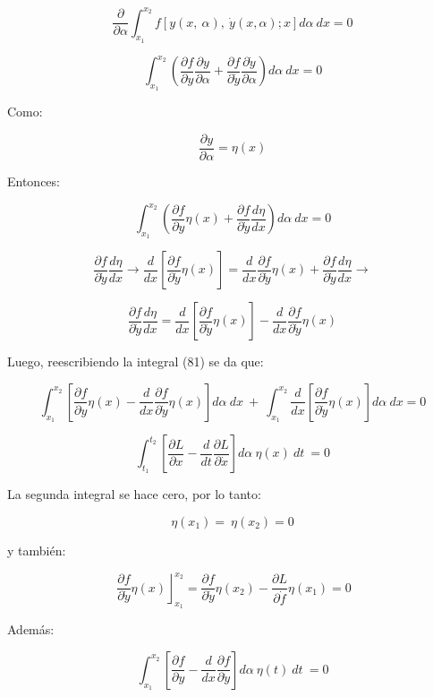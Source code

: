 \documentclass[]{article}
\begin{document}
\[\frac{\partial}{\partial\alpha}\int_{x_{1}}^{x_{2}}{f\left\lbrack y(x,\ \alpha),\ \dot{y}(x,\alpha);x \right\rbrack d\alpha\ dx = 0}\]

\[\int_{x_{1}}^{x_{2}}{\left( \frac{\partial f}{\partial y}\frac{\partial y}{\partial\alpha} + \frac{\partial f}{\partial\dot{y}}\frac{\partial\dot{y}}{\partial\alpha} \right)d\alpha\ dx = 0}\]

Como:

\[\frac{\partial y}{\partial\alpha} = \eta(x)\]

Entonces:

\[\int_{x_{1}}^{x_{2}}{\left( \frac{\partial f}{\partial y}\eta(x) + \frac{\partial f}{\partial\dot{y}}\frac{d\eta}{dx} \right)d\alpha\ dx = 0}\]

\[\frac{\partial f}{\partial\dot{y}}\frac{d\eta}{dx} \rightarrow \frac{d}{dx}\left\lbrack \frac{\partial f}{\partial\dot{y}}\eta(x) \right\rbrack = \frac{d}{dx}\frac{\partial f}{\partial\dot{y}}\eta(x) + \frac{\partial f}{\partial\dot{y}}\frac{d\eta}{dx} \rightarrow\]

\[\frac{\partial f}{\partial\dot{y}}\frac{d\eta}{dx} = \frac{d}{dx}\left\lbrack \frac{\partial f}{\partial\dot{y}}\eta(x) \right\rbrack - \frac{d}{dx}\frac{\partial f}{\partial\dot{y}}\eta(x)\]

Luego, reescribiendo la integral (81) se da que:

\[\int_{x_{1}}^{x_{2}}{\left\lbrack \frac{\partial f}{\partial y}\eta(x) - \frac{d}{dx}\frac{\partial f}{\partial\dot{y}}\eta(x) \right\rbrack d\alpha\ dx\  + \ \int_{x_{1}}^{x_{2}}{\frac{d}{dx}\left\lbrack \frac{\partial f}{\partial\dot{y}}\eta(x) \right\rbrack d\alpha\ dx} = 0}\]

\[\int_{t_{1}}^{t_{2}}{\left\lbrack \frac{\partial L}{\partial x} - \frac{d}{dt}\frac{\partial L}{\partial\dot{x}} \right\rbrack d\alpha\ \eta(x)\ dt\  = 0}\]

La segunda integral se hace cero, por lo tanto:

\[\eta(x_{1}) = \ \eta\left( x_{2} \right) = 0\]

y también:

\[\left. \ \frac{\partial f}{\partial\dot{y}}\eta(x) \right\rfloor_{x_{1}}^{x_{2}} = \frac{\partial f}{\partial\dot{y}}\eta\left( x_{2} \right) - \frac{\partial L}{\partial\dot{f}}\eta\left( x_{1} \right) = 0\]

Además:

\[\int_{x_{1}}^{x_{2}}{\left\lbrack \frac{\partial f}{\partial y} - \frac{d}{dx}\frac{\partial f}{\partial\dot{y}} \right\rbrack d\alpha\ \eta(t)\ dt\  = 0}\]
\end{document}
